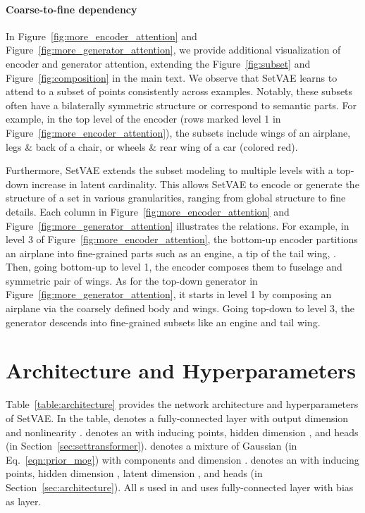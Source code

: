\documentclass[final]{arxiv/cvpr}
\begin{document}
\paragraph{Coarse-to-fine dependency}
In Figure~\ref{fig:more_encoder_attention} and Figure~\ref{fig:more_generator_attention}, we provide additional visualization of encoder and generator attention, extending the Figure~\ref{fig:subset} and Figure~\ref{fig:composition} in the main text.
We observe that SetVAE learns to attend to a subset of points consistently across examples.
Notably, these subsets often have a bilaterally symmetric structure or correspond to semantic parts.
For example, in the top level of the encoder (rows marked level 1 in Figure~\ref{fig:more_encoder_attention}), the subsets include wings of an airplane, legs \& back of a chair, or wheels \& rear wing of a car (colored red).

Furthermore, SetVAE extends the subset modeling to multiple levels with a top-down increase in latent cardinality.
This allows SetVAE to encode or generate the structure of a set in various granularities, ranging from global structure to fine details.
Each column in Figure~\ref{fig:more_encoder_attention} and Figure~\ref{fig:more_generator_attention} illustrates the relations.
For example, in level 3 of Figure~\ref{fig:more_encoder_attention}, the bottom-up encoder partitions an airplane into fine-grained parts such as an engine, a tip of the tail wing, \etc.
Then, going bottom-up to level 1, the encoder composes them to fuselage and symmetric pair of wings.
As for the top-down generator in Figure~\ref{fig:more_generator_attention}, it starts in level 1 by composing an airplane via the coarsely defined body and wings.
Going top-down to level 3, the generator descends into fine-grained subsets like an engine and tail wing.

\section{Architecture and Hyperparameters}
\label{appendix:training}
Table~\ref{table:architecture} provides the network architecture and hyperparameters of SetVAE.
In the table,  denotes a fully-connected layer with output dimension  and nonlinearity .
 denotes an  with  inducing points, hidden dimension , and  heads (in Section~\ref{sec:settransformer}).
 denotes a mixture of Gaussian (in Eq.~\eqref{eqn:prior_mog}) with  components and dimension .
 denotes an  with  inducing points, hidden dimension , latent dimension , and  heads (in Section~\ref{sec:architecture}).
All s used in  and  uses fully-connected layer with bias as  layer.
\end{document}
